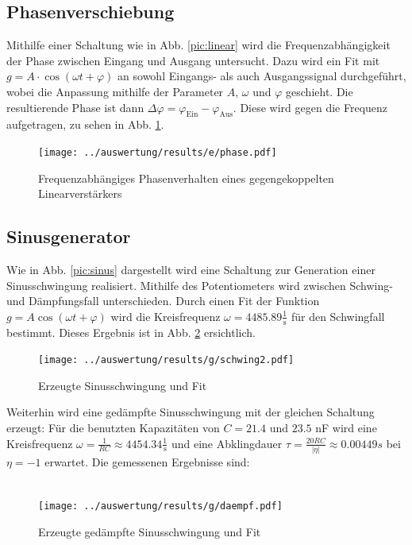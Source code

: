 \subsection{Phasenverschiebung}
Mithilfe einer Schaltung wie in Abb. \ref{pic:linear} wird die Frequenzabhängigkeit der Phase zwischen Eingang und Ausgang untersucht. Dazu wird ein Fit mit $g = A \cdot \cos (\omega t + \varphi)$ an sowohl Eingangs- als auch Ausgangssignal durchgeführt, wobei die Anpassung mithilfe der Parameter $A$, $\omega$ und $\varphi$ geschieht. Die resultierende Phase ist dann $\Delta \varphi = \varphi_\text{Ein} - \varphi_\text{Aus}$. Diese wird gegen die Frequenz aufgetragen, zu sehen in Abb. \ref{pic:e phase}.

\begin{figure}
	\centering
	\texttt{[image: ../auswertung/results/e/phase.pdf]}
	\caption{Frequenzabhängiges Phasenverhalten eines gegengekoppelten Linearverstärkers}
	\label{pic:e phase}
\end{figure}


\subsection{Sinusgenerator}
Wie in Abb. \ref{pic:sinus} dargestellt wird eine Schaltung zur Generation einer Sinusschwingung realisiert. Mithilfe des Potentiometers wird zwischen Schwing- und Dämpfungsfall unterschieden. Durch einen Fit der Funktion $g = A\cos(\omega t + \varphi)$ wird die Kreisfrequenz $\omega = 4485.89 \frac{1}{\si{\second}}$ für den Schwingfall bestimmt. Dieses Ergebnis ist in Abb. \ref{pic:g schwing} ersichtlich.

\begin{figure}
	\centering
	\texttt{[image: ../auswertung/results/g/schwing2.pdf]}
	\caption{Erzeugte Sinusschwingung und Fit}
	\label{pic:g schwing}
\end{figure}

Weiterhin wird eine gedämpfte Sinusschwingung mit der gleichen Schaltung erzeugt: Für die benutzten Kapazitäten von $C = 21.4$ und $23.5$ nF wird eine Kreisfrequenz $\omega = \frac{1}{RC} \approx 4454.34 \frac{1}{\si{\second}}$ und eine Abklingdauer $\tau = \frac{20RC}{|\eta|} \approx 0.00449 \si{s}$ bei $\eta = -1$ erwartet. Die gemessenen Ergebnisse sind:

\begin{align*}
	
\end{align*}

\begin{figure}
	\centering
	\texttt{[image: ../auswertung/results/g/daempf.pdf]}
	\caption{Erzeugte gedämpfte Sinusschwingung und Fit}
\end{figure}


